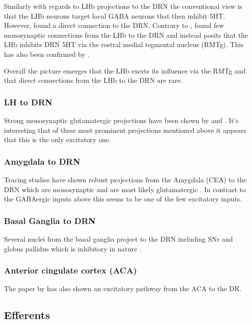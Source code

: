\documentclass[12pt,a4paper]{article}
\begin{document}
Similarly with regards to LHb projections to the DRN the conventional view is that the LHb neurons
target local GABA neurons that then inhibit 5HT. However, \citep{PollakDorocic2014} found a direct connection to the DRN. Contrary to \citep{PollakDorocic2014}, \citep{Ogawa2014} found few monosynaptic connections from the LHb to the DRN and instead posits that the LHb inhibits DRN 5HT via the rostral medial tegmental nucleus (RMTg). This has also been confirmed by \citep{Sego2014}.

Overall the picture emerges that the LHb exerts its influence via the RMTg and that direct connections from the LHb to the DRN are rare.

\subsubsection{LH to DRN}

Strong monosynaptic glutamatergic projections have been shown by \citep{Lee2003} and \citep{Aghajanian1990}. It's interesting that of these most prominent projections mentioned above it appears that this is the only excitatory one.

\subsubsection{Amygdala to DRN}

Tracing studies have shown robust projections from the Amygdala (CEA) to the DRN \citep{PollakDorocic2014} which are monosynaptic and are most likely glutamatergic \citep{Swanson1998}. In contrast to the GABAergic inputs above this seems to be one of the few excitatory inputs.

\subsubsection{Basal Ganglia to DRN}

Several nuclei from the basal ganglia project to the DRN including SNr and globus pallidus which is inhibitory in nature \citep{PollakDorocic2014}.

\subsubsection{Anterior cingulate cortex (ACA)}

The paper by  \citep{PollakDorocic2014} has also shown an excitatory pathway from the ACA to the DR.

\subsection{Efferents}
\end{document}

